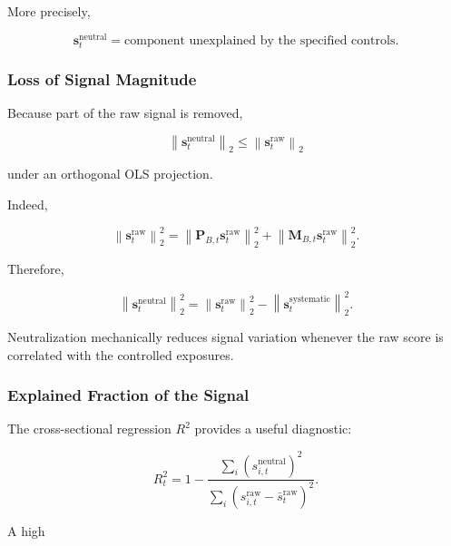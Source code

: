 \documentclass[11pt,a4paper]{article}
\begin{document}
More precisely,

\begin{equation}
\boxed{
\mathbf{s}_t^{\mathrm{neutral}}
=
\text{component unexplained by the specified controls}.
}
\end{equation}


\subsubsection{Loss of Signal Magnitude}

Because part of the raw signal is removed,

\begin{equation}
\left\|
\mathbf{s}_t^{\mathrm{neutral}}
\right\|_2
\leq
\left\|
\mathbf{s}_t^{\mathrm{raw}}
\right\|_2
\end{equation}

under an orthogonal OLS projection.

Indeed,

\begin{equation}
\left\|
\mathbf{s}_t^{\mathrm{raw}}
\right\|_2^2
=
\left\|
\mathbf{P}_{B,t}
\mathbf{s}_t^{\mathrm{raw}}
\right\|_2^2
+
\left\|
\mathbf{M}_{B,t}
\mathbf{s}_t^{\mathrm{raw}}
\right\|_2^2.
\end{equation}

Therefore,

\begin{equation}
\boxed{
\left\|
\mathbf{s}_t^{\mathrm{neutral}}
\right\|_2^2
=
\left\|
\mathbf{s}_t^{\mathrm{raw}}
\right\|_2^2
-
\left\|
\mathbf{s}_t^{\mathrm{systematic}}
\right\|_2^2.
}
\end{equation}

Neutralization mechanically reduces signal variation whenever the raw score is
correlated with the controlled exposures.


\subsubsection{Explained Fraction of the Signal}

The cross-sectional regression $R^2$ provides a useful diagnostic:

\begin{equation}
\boxed{
R_t^2
=
1
-
\frac{
\sum_i
\left(
s_{i,t}^{\mathrm{neutral}}
\right)^2
}{
\sum_i
\left(
s_{i,t}^{\mathrm{raw}}
-
\bar{s}_t^{\mathrm{raw}}
\right)^2
}.
}
\end{equation}

A high
\end{document}
